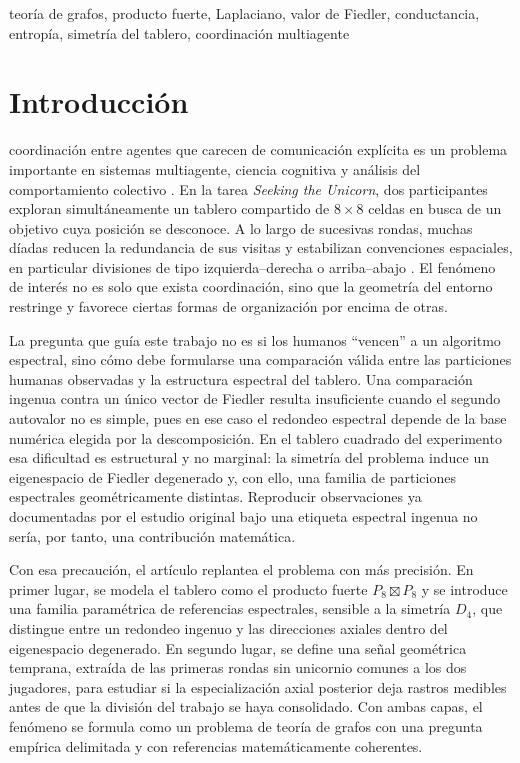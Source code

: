 \documentclass[journal]{IEEEtran}
\begin{document}
\begin{IEEEkeywords}
teoría de grafos, producto fuerte, Laplaciano, valor de Fiedler, conductancia, entropía, simetría del tablero, coordinación multiagente
\end{IEEEkeywords}

\section{Introducción}

 coordinación entre agentes que carecen de comunicación explícita es un problema importante en sistemas multiagente, ciencia cognitiva y análisis del comportamiento colectivo \cite{mesbahi2010,andrade2021,goldstone2024}. En la tarea \emph{Seeking the Unicorn}, dos participantes exploran simultáneamente un tablero compartido de $8\times 8$ celdas en busca de un objetivo cuya posición se desconoce. A lo largo de sucesivas rondas, muchas díadas reducen la redundancia de sus visitas y estabilizan convenciones espaciales, en particular divisiones de tipo izquierda--derecha o arriba--abajo \cite{andrade2021}. El fenómeno de interés no es solo que exista coordinación, sino que la geometría del entorno restringe y favorece ciertas formas de organización por encima de otras.

La pregunta que guía este trabajo no es si los humanos ``vencen'' a un algoritmo espectral, sino cómo debe formularse una comparación válida entre las particiones humanas observadas y la estructura espectral del tablero. Una comparación ingenua contra un único vector de Fiedler resulta insuficiente cuando el segundo autovalor no es simple, pues en ese caso el redondeo espectral depende de la base numérica elegida por la descomposición. En el tablero cuadrado del experimento esa dificultad es estructural y no marginal: la simetría del problema induce un eigenespacio de Fiedler degenerado y, con ello, una familia de particiones espectrales geométricamente distintas. Reproducir observaciones ya documentadas por el estudio original \cite{andrade2021} bajo una etiqueta espectral ingenua no sería, por tanto, una contribución matemática.

Con esa precaución, el artículo replantea el problema con más precisión. En primer lugar, se modela el tablero como el producto fuerte $P_8 \boxtimes P_8$ y se introduce una familia paramétrica de referencias espectrales, sensible a la simetría $D_4$, que distingue entre un redondeo ingenuo y las direcciones axiales dentro del eigenespacio degenerado. En segundo lugar, se define una señal geométrica temprana, extraída de las primeras rondas sin unicornio comunes a los dos jugadores, para estudiar si la especialización axial posterior deja rastros medibles antes de que la división del trabajo se haya consolidado. Con ambas capas, el fenómeno se formula como un problema de teoría de grafos con una pregunta empírica delimitada y con referencias matemáticamente coherentes.
\end{document}

